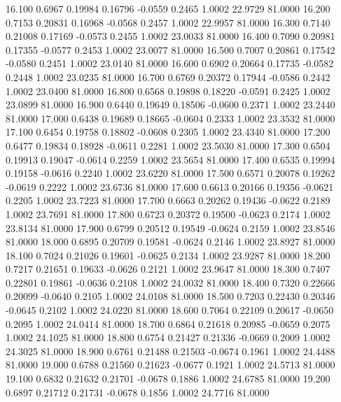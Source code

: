   16.100   0.6967   0.19984   0.16796  -0.0559   0.2465   1.0002  22.9729  81.0000
  16.200   0.7153   0.20831   0.16968  -0.0568   0.2457   1.0002  22.9957  81.0000
  16.300   0.7140   0.21008   0.17169  -0.0573   0.2455   1.0002  23.0033  81.0000
  16.400   0.7090   0.20981   0.17355  -0.0577   0.2453   1.0002  23.0077  81.0000
  16.500   0.7007   0.20861   0.17542  -0.0580   0.2451   1.0002  23.0140  81.0000
  16.600   0.6902   0.20664   0.17735  -0.0582   0.2448   1.0002  23.0235  81.0000
  16.700   0.6769   0.20372   0.17944  -0.0586   0.2442   1.0002  23.0400  81.0000
  16.800   0.6568   0.19898   0.18220  -0.0591   0.2425   1.0002  23.0899  81.0000
  16.900   0.6440   0.19649   0.18506  -0.0600   0.2371   1.0002  23.2440  81.0000
  17.000   0.6438   0.19689   0.18665  -0.0604   0.2333   1.0002  23.3532  81.0000
  17.100   0.6454   0.19758   0.18802  -0.0608   0.2305   1.0002  23.4340  81.0000
  17.200   0.6477   0.19834   0.18928  -0.0611   0.2281   1.0002  23.5030  81.0000
  17.300   0.6504   0.19913   0.19047  -0.0614   0.2259   1.0002  23.5654  81.0000
  17.400   0.6535   0.19994   0.19158  -0.0616   0.2240   1.0002  23.6220  81.0000
  17.500   0.6571   0.20078   0.19262  -0.0619   0.2222   1.0002  23.6736  81.0000
  17.600   0.6613   0.20166   0.19356  -0.0621   0.2205   1.0002  23.7223  81.0000
  17.700   0.6663   0.20262   0.19436  -0.0622   0.2189   1.0002  23.7691  81.0000
  17.800   0.6723   0.20372   0.19500  -0.0623   0.2174   1.0002  23.8134  81.0000
  17.900   0.6799   0.20512   0.19549  -0.0624   0.2159   1.0002  23.8546  81.0000
  18.000   0.6895   0.20709   0.19581  -0.0624   0.2146   1.0002  23.8927  81.0000
  18.100   0.7024   0.21026   0.19601  -0.0625   0.2134   1.0002  23.9287  81.0000
  18.200   0.7217   0.21651   0.19633  -0.0626   0.2121   1.0002  23.9647  81.0000
  18.300   0.7407   0.22801   0.19861  -0.0636   0.2108   1.0002  24.0032  81.0000
  18.400   0.7320   0.22666   0.20099  -0.0640   0.2105   1.0002  24.0108  81.0000
  18.500   0.7203   0.22430   0.20346  -0.0645   0.2102   1.0002  24.0220  81.0000
  18.600   0.7064   0.22109   0.20617  -0.0650   0.2095   1.0002  24.0414  81.0000
  18.700   0.6864   0.21618   0.20985  -0.0659   0.2075   1.0002  24.1025  81.0000
  18.800   0.6754   0.21427   0.21336  -0.0669   0.2009   1.0002  24.3025  81.0000
  18.900   0.6761   0.21488   0.21503  -0.0674   0.1961   1.0002  24.4488  81.0000
  19.000   0.6788   0.21560   0.21623  -0.0677   0.1921   1.0002  24.5713  81.0000
  19.100   0.6832   0.21632   0.21701  -0.0678   0.1886   1.0002  24.6785  81.0000
  19.200   0.6897   0.21712   0.21731  -0.0678   0.1856   1.0002  24.7716  81.0000
